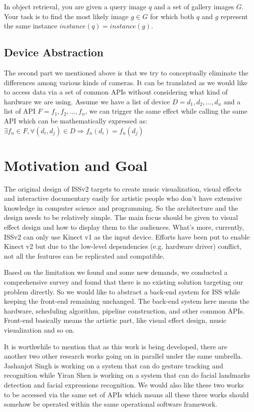In object retrieval, you are given a query image $q$ and a set of gallery images
$G$. Your task is to find the
most likely image $g \in G$ for which both $q$ and $g$ represent the same instance
$instance(q) = instance(g)$.

\subsection{Device Abstraction}

The second part we mentioned above is that we try to conceptually eliminate the differences
among various kinds of cameras. It can be translated as we would like to access
data via a set of common APIs without considering what kind of hardware
we are using. Assume we have a list of device $D = {d_1, d_2, ..., d_n}$ and a
list of API $F = {f_1, f_2, ..., f_n}$,
we can trigger the same effect
while calling the same API which can be mathematically expressed as:
$
\exists f_n \in F, \forall (d_i, d_j) \in D
\Longrightarrow f_{n}(d_i) = f_{n}(d_j)
$

\section{Motivation and Goal}
\label{sec:intro-mot-goal}

The original design of ISSv2 targets to create music visualization, visual
effects and interactive documentary easily for artistic people who don't have 
extensive knowledge in computer science and programming. So the architecture and
the design needs to be relatively simple. The main focus should be given to visual effect
design and how to display them to the audiences.
What's more, currently, ISSv2 can only use Kinect v1 as the input device. Efforts have
been put to enable Kinect v2 but due to the low-level dependencies (e.g.
hardware driver) conflict, not all the features can be replicated and compatible.

Based on the limitation we found and some new demands,
we conducted a comprehensive survey and found that there is no existing solution
targeting our problem directly.
So we would like to abstract a back-end system for ISS while keeping the
front-end remaining unchanged. The back-end system here means the hardware,
scheduling algorithm, pipeline construction, and other common APIs. Front-end
basically means the artistic part, like visual effect design, music
visualization and so on.

It is worthwhile to mention that as this work is being developed, there are
another two other research works going on in parallel under the same umbrella.
Jashanjot Singh is working on a system that can do gesture tracking and
recognition while Yiran Shen is working on a system that can do facial
landmarks detection and facial expressions recognition. We would also like
these two works to be accessed via the same set of APIs which means all these
three works should somehow be operated within the same operational software
framework.

